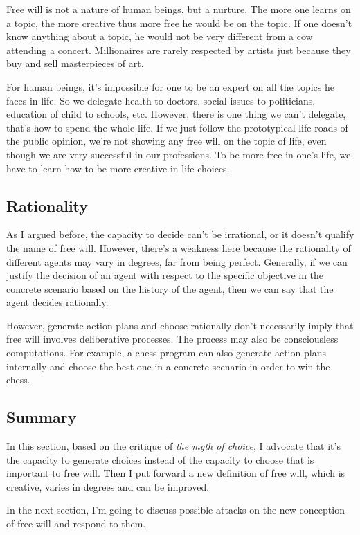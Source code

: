 Free will is not a nature of human beings, but a nurture. The more one learns on a topic, the more creative thus more free he would be on the topic. If one doesn't know anything about a topic, he would not be very different from a cow attending a concert. Millionaires are rarely respected by artists just because they buy and sell masterpieces of art.

For human beings, it's impossible for one to be an expert on all the topics he faces in life. So we delegate health to doctors, social issues to politicians, education of child to schools, etc. However, there is one thing we can't delegate, that's how to spend the whole life. If we just follow the prototypical life roads of the public opinion, we're not showing any free will on the topic of life, even though we are very successful in our professions. To be more free in one's life, we have to learn how to be more creative in life choices.

\subsection{Rationality}

As I argued before, the capacity to decide can't be irrational, or it doesn't qualify the name of free will. However, there’s a weakness here because the rationality of different agents may vary in degrees, far from being perfect. Generally, if we can justify the decision of an agent with respect to the specific objective in the concrete scenario based on the history of the agent, then we can say that the agent decides rationally.

However, generate action plans and choose rationally don’t necessarily imply that free will involves deliberative processes. The process may also be consciousless computations. For example, a chess program can also generate action plans internally and choose the best one in a concrete scenario in order to win the chess.

\subsection{Summary}

In this section, based on the critique of \emph{the myth of choice}, I advocate that it's the capacity to generate choices instead of the capacity to choose that is important to free will. Then I put forward a new definition of free will, which is creative, varies in degrees and can be improved.

In the next section, I'm going to discuss possible attacks on the new conception of free will and respond to them.
